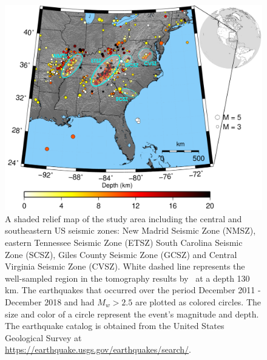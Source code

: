 \documentclass[draft,linenumbers]{agujournal2018}
\begin{document}
\begin{figure}[ht]
    \centering
    \includegraphics[width=32pc]{figures/seismicity_new.png}
    \caption{ A shaded relief map of the study area including the central and southeastern US seismic zones: New Madrid Seismic Zone (NMSZ), eastern Tennessee  Seismic Zone (ETSZ) South Carolina Seismic Zone (SCSZ), Giles County Seismic Zone (GCSZ) and Central Virginia Seismic Zone (CVSZ). White dashed line represents the well-sampled region in the tomography results by~\citet{Biryol_2016} at a depth 130 km. The earthquakes that occurred over the period December 2011 - December 2018 and had $M_{w} > 2.5$ are plotted as colored circles. The size and color of a circle represent the event's magnitude and depth. The earthquake catalog is obtained from the United States Geological Survey at \url{https://earthquake.usgs.gov/earthquakes/search/}.}
    \label{figone}
 \end{figure}
    
\end{document}
